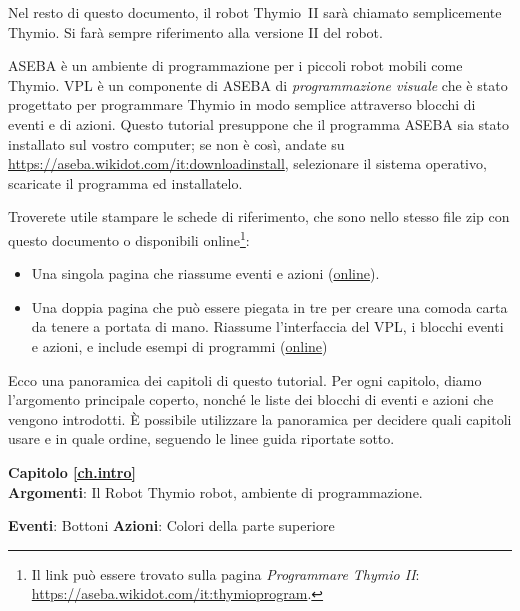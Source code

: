 Nel resto di questo documento, il robot Thymio~II sarà chiamato semplicemente Thymio.
Si farà sempre riferimento alla versione II del robot.

ASEBA è un ambiente di programmazione per i piccoli robot mobili come Thymio.
VPL è un componente di ASEBA di \textit{programmazione visuale} che è stato progettato per programmare Thymio in modo semplice attraverso blocchi di eventi e di azioni.
Questo tutorial presuppone che il programma ASEBA sia stato installato sul vostro computer; se non è così, andate su \url{https://aseba.wikidot.com/it:downloadinstall}, selezionare il sistema operativo, scaricate il programma ed installatelo.

Troverete utile stampare le schede di riferimento, che sono nello stesso file zip con questo documento o disponibili online\footnote{Il link può essere trovato sulla pagina \textit{Programmare Thymio II}: \\
\url{https://aseba.wikidot.com/it:thymioprogram}.}:
\begin{itemize}
\item Una singola pagina che riassume eventi e azioni (\href{https://aseba.wdfiles.com/local--files/it:thymioprogram/thymio-vpl-ref-card-it.pdf}{online}).
\item Una doppia pagina che può essere piegata in tre per creare una comoda carta da tenere a portata di mano.
Riassume l'interfaccia del VPL, i blocchi eventi e azioni, e include esempi di programmi (\href{https://aseba.wdfiles.com/local--files/it:thymioprogram/thymio-vpl-folding-ref-card-it.pdf}{online})\\
\end{itemize}


Ecco una panoramica dei capitoli di questo tutorial.
Per ogni capitolo, diamo l'argomento principale coperto, nonché le liste
dei blocchi di eventi e azioni che vengono introdotti.
È possibile utilizzare la panoramica per decidere quali capitoli usare
e in quale ordine, seguendo le linee guida riportate sotto.

{\centering \textbf{Capitolo \ref{ch.intro}}\\}
\textbf{Argomenti}: Il Robot Thymio robot, ambiente di programmazione.

\textbf{Eventi}: Bottoni \hfill \textbf{Azioni}: Colori della parte superiore

 \hfill {}

